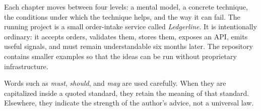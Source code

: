 \documentclass[11pt,openright]{book}
\begin{document}
Each chapter moves between four levels: a mental model, a concrete technique,
the conditions under which the technique helps, and the way it can fail. The
running project is a small order-intake service called \emph{Ledgerline}. It is
intentionally ordinary: it accepts orders, validates them, stores them, exposes
an API, emits useful signals, and must remain understandable six months later.
The repository contains smaller examples so that the ideas can be run without
proprietary infrastructure.

Words such as \emph{must}, \emph{should}, and \emph{may} are used carefully.
When they are capitalized inside a quoted standard, they retain the meaning of
that standard. Elsewhere, they indicate the strength of the author's advice,
not a universal law.

\mainmatter



















\appendix




\backmatter
\end{document}
